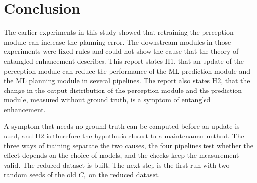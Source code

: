 \documentclass[11pt,a4paper]{article}
\begin{document}
\section{Conclusion}

The earlier experiments in this study showed that retraining the
perception module can increase the planning error. The downstream modules
in those experiments were fixed rules and could not show the cause that
the theory of entangled enhancement describes. This report states H1, that
an update of the perception module can reduce the performance of the ML
prediction module and the ML planning module in several pipelines. The
report also states H2, that the change in the output distribution of the
perception module and the prediction module, measured without ground
truth, is a symptom of entangled enhancement.

A symptom that needs no ground truth can be computed before an update is
used, and H2 is therefore the hypothesis closest to a maintenance method.
The three ways of training separate the two causes, the four pipelines
test whether the effect depends on the choice of models, and the checks
keep the measurement valid. The reduced dataset is built. The next step is
the first run with two random seeds of the old $C_1$ on the reduced
dataset.

\FloatBarrier


\end{document}
